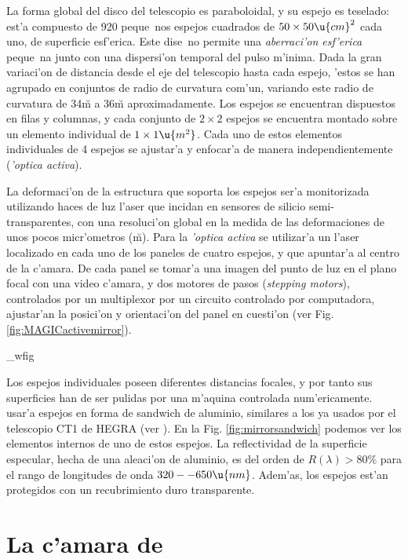 La forma global del disco del telescopio es paraboloidal, y su espejo
es teselado: est'a compuesto de 920 peque~nos espejos cuadrados de
$50\times 50 \u{cm}^2$ cada uno, de superficie esf'erica. Este dise~no
permite una \emph{aberraci'on esf'erica} peque~na junto con una
dispersi'on temporal del pulso \Cerenkov m'inima. Dada la gran
variaci'on de distancia desde el eje del telescopio hasta cada espejo,
'estos se han agrupado en conjuntos de radio de curvatura com'un,
variando este radio de curvatura de 34\u{m} a 36\u{m} aproximadamente.
Los espejos se encuentran dispuestos en filas y columnas, y cada
conjunto de $2 \times 2$ espejos se encuentra montado sobre un
elemento individual de $1 \times 1 \u{m^2}$. Cada uno de estos
elementos individuales de 4 espejos se ajustar'a y enfocar'a de manera
independientemente (\emph{'optica activa}).

La deformaci'on de la estructura que soporta los espejos ser'a
monitorizada utilizando haces de luz l'aser que incidan en sensores de
silicio semi-transparentes, con una resoluci'on global en la medida de
las deformaciones de unos pocos micr'ometros (\u{\mu m}). Para la
\emph{'optica activa} se utilizar'a un l'aser localizado en cada uno
de los paneles de cuatro espejos, y que apuntar'a al centro de la
c'amara. De cada panel se tomar'a una imagen del punto de luz en el
plano focal con una video c'amara, y dos motores de pasos
(\emph{stepping motors}), controlados por un multiplexor por un
circuito controlado por computadora, ajustar'an la posici'on y
orientaci'on del panel en cuesti'on (ver Fig.
\ref{fig:MAGICactivemirror}).

\MAGICmirrorcontrol_wfig

Los espejos individuales poseen diferentes distancias focales, y por
tanto sus superficies han de ser pulidas por una m'aquina controlada
num'ericamente. \MAGIC usar'a espejos en forma de sandwich de
aluminio, similares a los ya usados por el telescopio CT1 de HEGRA
(ver ). En la Fig. \ref{fig:mirrorsandwich}
podemos ver los elementos internos de uno de estos espejos. La
reflectividad de la superficie especular, hecha de una aleaci'on de
aluminio, es del orden de $R(\lambda) > 80\%$ para el rango de
longitudes de onda $320--650\u{nm}$. Adem'as, los espejos est'an
protegidos con un recubrimiento duro transparente.

\section{La c'amara de \MAGIC}
%
